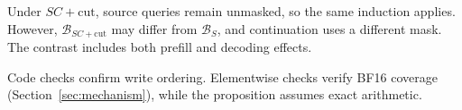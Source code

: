 Under $SC+\mathrm{cut}$, source queries remain unmasked, so the same
induction applies. However, $\mathcal B_{SC+\mathrm{cut}}$ may differ
from $\mathcal B_S$, and continuation uses a different mask. The contrast
includes both prefill and decoding effects.

Code checks confirm write ordering. Elementwise checks verify BF16
coverage (Section~\ref{sec:mechanism}), while the proposition assumes
exact arithmetic.


